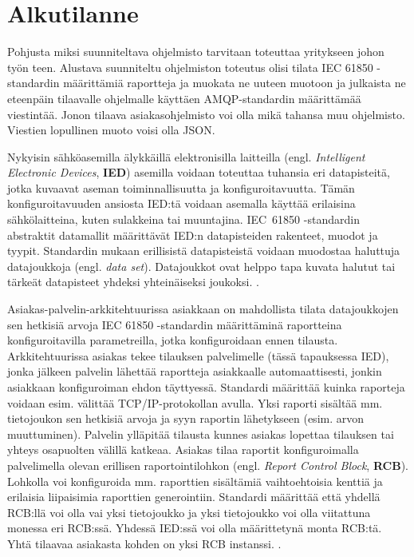\chapter{Alkutilanne}
\label{ch:alkutilanne}

\begin{it}
	Pohjusta miksi suunniteltava ohjelmisto tarvitaan toteuttaa yritykseen johon työn teen. Alustava suunniteltu ohjelmiston toteutus olisi tilata IEC 61850 -standardin määrittämiä raportteja ja muokata ne uuteen muotoon ja julkaista ne eteenpäin tilaavalle ohjelmalle käyttäen AMQP-standardin määrittämää viestintää. Jonon tilaava asiakasohjelmisto voi olla mikä tahansa muu ohjelmisto. Viestien lopullinen muoto voisi olla JSON.
\end{it}

Nykyisin sähköasemilla älykkäillä elektronisilla laitteilla (engl. \emph{Intelligent Electronic Devices}, \textbf{IED}) asemilla voidaan toteuttaa tuhansia eri datapisteitä, jotka kuvaavat aseman toiminnallisuutta ja konfiguroitavuutta. Tämän konfiguroitavuuden ansiosta IED:tä voidaan asemalla käyttää erilaisina sähkölaitteina, kuten sulakkeina tai muuntajina. IEC~61850 -standardin abstraktit datamallit määrittävät IED:n datapisteiden rakenteet, muodot ja tyypit. Standardin mukaan erillisistä datapisteistä voidaan muodostaa haluttuja datajoukkoja (engl. \emph{data set}). Datajoukkot ovat helppo tapa kuvata halutut tai tärkeät datapisteet yhdeksi yhteinäiseksi joukoksi. \mbox{\cite{Mackiewicz2006}}.

Asiakas-palvelin-arkkitehtuurissa asiakkaan on mahdollista tilata datajoukkojen sen hetkisiä arvoja IEC 61850 -standardin määrittäminä raportteina konfiguroitavilla parametreilla, jotka konfiguroidaan ennen tilausta. Arkkitehtuurissa asiakas tekee tilauksen palvelimelle (tässä tapauksessa IED), jonka jälkeen palvelin lähettää raportteja asiakkaalle automaattisesti, jonkin asiakkaan konfiguroiman ehdon täyttyessä. Standardi määrittää kuinka raporteja voidaan esim. välittää TCP/IP-protokollan avulla. Yksi raporti sisältää mm. tietojoukon sen hetkisiä arvoja ja syyn raportin lähetykseen (esim. arvon muuttuminen). Palvelin ylläpitää tilausta kunnes asiakas lopettaa tilauksen tai yhteys osapuolten välillä katkeaa. Asiakas tilaa raportit konfiguroimalla palvelimella olevan erillisen raportointilohkon (engl. \emph{Report Control Block}, \textbf{RCB}). Lohkolla voi konfiguroida mm. raporttien sisältämiä vaihtoehtoisia kenttiä ja erilaisia liipaisimia raporttien generointiin. Standardi määrittää että yhdellä RCB:llä voi olla vai yksi tietojoukko ja yksi tietojoukko voi olla viitattuna monessa eri RCB:ssä. Yhdessä IED:ssä voi olla määrittetynä monta RCB:tä. Yhtä tilaavaa asiakasta kohden on yksi RCB instanssi. \mbox{\cite[s.~91--130]{IEC61850-7-2}}.

